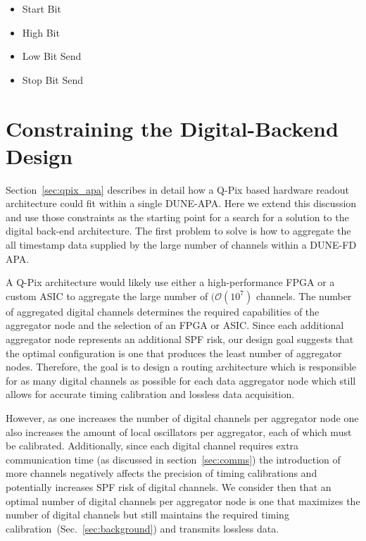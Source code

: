 \begin{itemize}
    \item Start Bit
    \item High Bit
    \item Low Bit Send
    \item Stop Bit Send
\end{itemize}\label{item:endeavor}

\section{Constraining the Digital-Backend Design}

Section~\ref{sec:qpix_apa} describes in detail how a Q-Pix based hardware readout architecture could fit within a single DUNE-APA.
Here we extend this discussion and use those constraints as the starting point for a search for a solution to the digital back-end architecture.
The first problem to solve is how to aggregate the all timestamp data supplied by the large number of channels within a DUNE-FD APA.

A Q-Pix architecture would likely use either a high-performance FPGA or a custom ASIC to aggregate the large number of $(\mathcal{O}(10^{7})$ channels.
The number of aggregated digital channels determines the required capabilities of the aggregator node and the selection of an FPGA or ASIC.
Since each additional aggregator node represents an additional SPF risk, our design goal suggests that the optimal configuration is one that produces the least number of aggregator nodes.
Therefore, the goal is to design a routing architecture which is responsible for as many digital channels as possible for each data aggregator node which still allows for accurate timing calibration and lossless data acquisition.

However, as one increases the number of digital channels per aggregator node one also increases the amount of local oscillators per aggregator, each of which must be calibrated.
Additionally, since each digital channel requires extra communication time (as discussed in section~\ref{sec:comms}) the introduction of more channels negatively affects the precision of timing calibrations and potentially increases SPF risk of digital channels.
We consider then that an optimal number of digital channels per aggregator node is one that maximizes the number of digital channels but still maintains the required timing calibration~(Sec.~\ref{sec:background}) and transmits lossless data.


